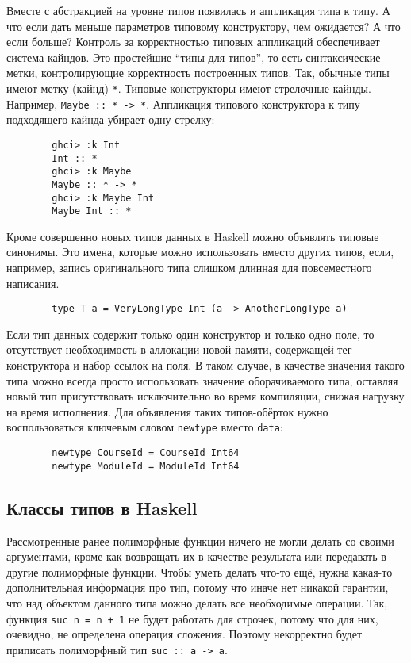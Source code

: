 \documentclass[12pt]{article}
\begin{document}
    Вместе с абстракцией на уровне типов появилась и аппликация типа к типу.
    А что если дать меньше параметров типовому конструктору, чем ожидается?
    А что если больше?
    Контроль за корректностью типовых аппликаций обеспечивает система кайндов.
    Это простейшие ``типы для типов'', то есть синтаксические метки, контролирующие корректность построенных типов.
    Так, обычные типы имеют метку (кайнд) \texttt{*}.
    Типовые конструкторы имеют стрелочные кайнды.
    Например, \texttt{Maybe :: * -> *}.
    Аппликация типового конструктора к типу подходящего кайнда убирает одну стрелку:
    \begin{verbatim}
        ghci> :k Int
        Int :: *
        ghci> :k Maybe
        Maybe :: * -> *
        ghci> :k Maybe Int
        Maybe Int :: *
    \end{verbatim}

    Кроме совершенно новых типов данных в Haskell можно объявлять типовые синонимы.
    Это имена, которые можно использовать вместо других типов, если, например, запись оригинального типа слишком длинная для повсеместного написания.
    \begin{verbatim}
        type T a = VeryLongType Int (a -> AnotherLongType a)
    \end{verbatim}

    Если тип данных содержит только один конструктор и только одно поле, то отсутствует необходимость в аллокации новой памяти, содержащей тег конструктора и набор ссылок на поля.
    В таком случае, в качестве значения такого типа можно всегда просто использовать значение оборачиваемого типа, оставляя новый тип присутствовать исключительно во время компиляции, снижая нагрузку на время исполнения.
    Для объявления таких типов-обёрток нужно воспользоваться ключевым словом \texttt{newtype} вместо \texttt{data}:
    \begin{verbatim}
        newtype CourseId = CourseId Int64
        newtype ModuleId = ModuleId Int64
    \end{verbatim}

    \subsection{Классы типов в Haskell}

    Рассмотренные ранее полиморфные функции ничего не могли делать со своими аргументами, кроме как возвращать их в качестве результата или передавать в другие полиморфные функции.
    Чтобы уметь делать что-то ещё, нужна какая-то дополнительная информация про тип, потому что иначе нет никакой гарантии, что над объектом данного типа можно делать все необходимые операции.
    Так, функция \texttt{suc n = n + 1} не будет работать для строчек, потому что для них, очевидно, не определена операция сложения.
    Поэтому некорректно будет приписать полиморфный тип \texttt{suc :: a -> a}.
\end{document}
